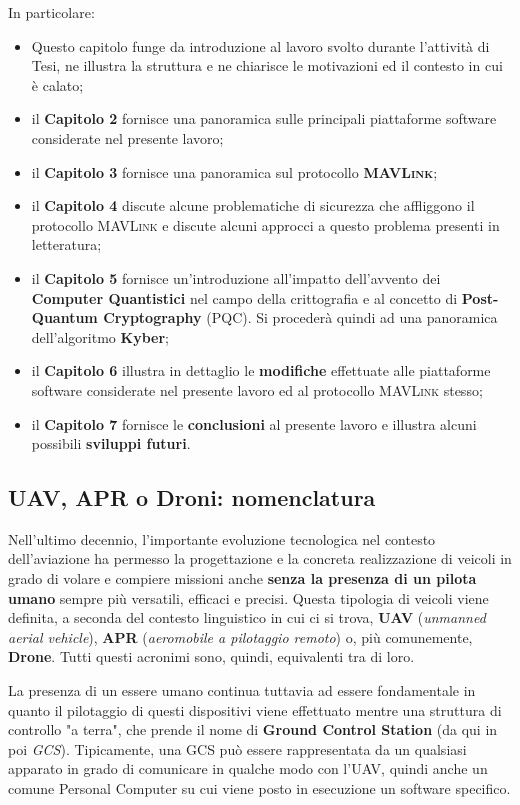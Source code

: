 \documentclass[a4paper, 12pt, oneside]{article}
\theoremstyle{definition}
\begin{document}
In particolare:

\begin{itemize}
    \item Questo capitolo funge da introduzione al lavoro svolto durante l'attività di Tesi, ne illustra la struttura e ne chiarisce le motivazioni ed il contesto in cui è calato;
    \item il \textbf{Capitolo 2} fornisce una panoramica sulle principali piattaforme software considerate nel presente lavoro;
    \item il \textbf{Capitolo 3} fornisce una panoramica sul protocollo \textbf{\textsc{MAVLink}};
    \item il \textbf{Capitolo 4} discute alcune problematiche di sicurezza che affliggono il protocollo \textsc{MAVLink} e discute alcuni approcci a questo problema presenti in letteratura;
    \item il \textbf{Capitolo 5} fornisce un'introduzione all'impatto dell'avvento dei \textbf{Computer Quantistici} nel campo della crittografia e al concetto di \textbf{Post-Quantum Cryptography} (PQC). Si procederà quindi ad una panoramica dell'algoritmo \textbf{Kyber};
    \item il \textbf{Capitolo 6} illustra in dettaglio le \textbf{modifiche} effettuate alle piattaforme software considerate nel presente lavoro ed al protocollo \textsc{MAVLink} stesso;
    \item il \textbf{Capitolo 7} fornisce le \textbf{conclusioni} al presente lavoro e illustra alcuni possibili \textbf{sviluppi futuri}.
\end{itemize}

\newpage


\subsection{UAV, APR o Droni: nomenclatura}
Nell'ultimo decennio, l'importante evoluzione tecnologica nel contesto dell'aviazione ha permesso la progettazione e la concreta realizzazione di veicoli in grado di volare e compiere missioni anche \textbf{senza la presenza di un pilota umano} sempre più versatili, efficaci e precisi. Questa tipologia di veicoli viene definita, a seconda del contesto linguistico in cui ci si trova, \textbf{UAV} (\textit{unmanned aerial vehicle}), \textbf{APR} (\textit{aeromobile a pilotaggio remoto}) o, più comunemente, \textbf{Drone}. Tutti questi acronimi sono, quindi, equivalenti tra di loro. 

La presenza di un essere umano continua tuttavia ad essere fondamentale in quanto il pilotaggio di questi dispositivi viene effettuato mentre una struttura di controllo "a terra", che prende il nome di \textbf{Ground Control Station} (da qui in poi \textit{GCS}). Tipicamente, una GCS può essere rappresentata da un qualsiasi apparato in grado di comunicare in qualche modo con l'UAV, quindi anche un comune Personal Computer su cui viene posto in esecuzione un software specifico.
\end{document}
